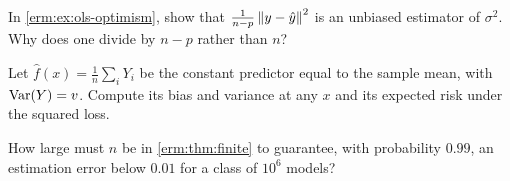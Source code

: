 \begin{notechapter}
\begin{exercise}\label{erm:exr:2}
In \cref{erm:ex:ols-optimism}, show that $\frac{1}{n-p}\left\|y-\hat y\right\|^2$ is an
unbiased estimator of $\sigma^2$. Why does one divide by $n-p$ rather than $n$?
\end{exercise}

\begin{exercise}\label{erm:exr:3}
Let $\hat f(x) = \frac1n\sum_i Y_i$ be the constant predictor equal to the
sample mean, with $\operatorname{Var}(Y) = v$. Compute its bias and variance at any $x$ and
its expected risk under the squared loss.
\end{exercise}

\begin{exercise}\label{erm:exr:4}
How large must $n$ be in \cref{erm:thm:finite} to guarantee, with
probability $0.99$, an estimation error below $0.01$ for a class of $10^6$
models?
\end{exercise}
\end{notechapter}
